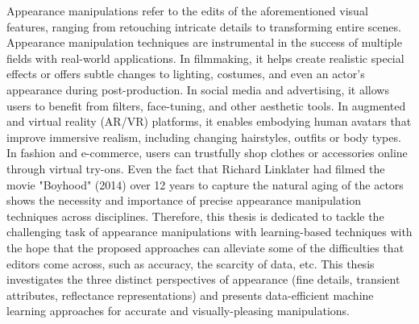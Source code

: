 Appearance manipulations refer to the edits of the aforementioned visual features, ranging from retouching intricate details to transforming entire scenes. Appearance manipulation techniques are instrumental in the success of multiple fields with real-world applications. In filmmaking, it helps create realistic special effects or offers subtle changes to lighting, costumes, and even an actor’s appearance during post-production. In social media and advertising, it allows users to benefit from filters, face-tuning, and other aesthetic tools. In augmented and virtual reality (AR/VR) platforms, it enables embodying human avatars that improve immersive realism, including changing hairstyles, outfits or body types. In fashion and e-commerce, users can trustfully shop clothes or accessories online through virtual try-ons. Even the fact that Richard Linklater had filmed the movie "Boyhood" (2014) over 12 years to capture the natural aging of the actors shows the necessity and importance of precise appearance manipulation techniques across disciplines. Therefore, this thesis is dedicated to tackle the challenging task of appearance manipulations with learning-based techniques with the hope that the proposed approaches can alleviate some of the difficulties that editors come across, such as accuracy, the scarcity of data, etc. This thesis investigates the three distinct perspectives of appearance (fine details, transient attributes, reflectance representations) and presents data-efficient machine learning approaches for accurate and visually-pleasing manipulations.

